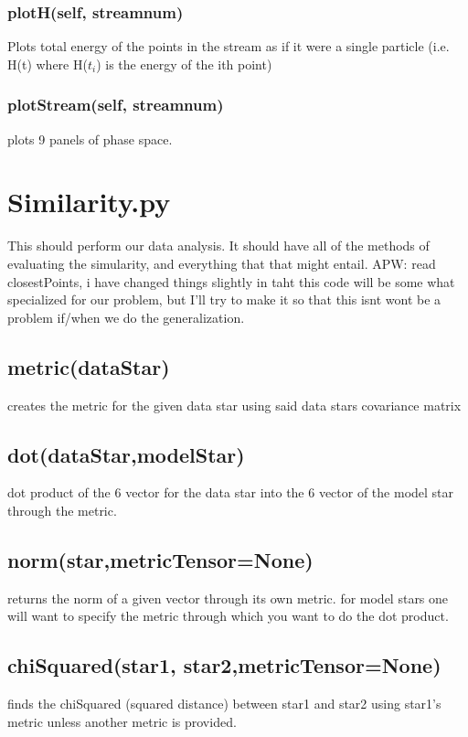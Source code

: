 \documentclass{article}
\begin{document}
\subsubsection{plotH(self, streamnum)}
Plots total energy of the points in the stream as if it were a single particle (i.e. H(t) where H($t_i$) is the energy of the ith point)

\subsubsection{plotStream(self, streamnum)}
plots 9 panels of phase space.



\section{Similarity.py}
This should perform our data analysis. It should have all of the methods of evaluating the simularity, and everything that that might entail. APW: read closestPoints,
i have changed things slightly in taht this code will be some what specialized for our problem, but I'll try to make it so that this isnt wont be a problem
if/when we do the generalization.

\subsection{metric(dataStar)}
creates the metric for the given data star using said data stars covariance matrix

\subsection{dot(dataStar,modelStar)}
dot product of the 6 vector for the data star into the 6 vector of the model star through the metric.

\subsection{norm(star,metricTensor=None)}
returns the norm of a given vector through its own metric. for model stars one will want to specify the metric through which you want to do the dot product.

\subsection{chiSquared(star1, star2,metricTensor=None)}
finds the chiSquared (squared distance) between star1 and star2 using star1's metric unless another metric is provided.
\end{document}

